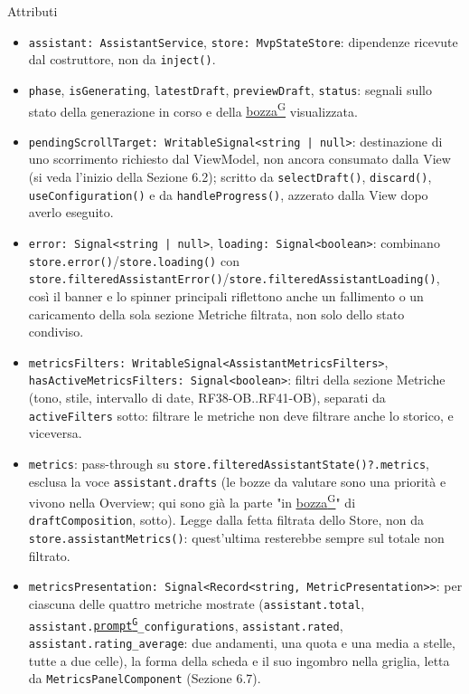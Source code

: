 \documentclass[a4paper,12pt]{article}
\providecommand{\glslink}[2]{\href{https://alittlebyte-19.github.io/Documentazione/glossario.html\#gls-#1}{\underline{#2}\textsuperscript{\scriptsize G}}}
\begin{document}
\begin{sloppypar}
Attributi
\begin{itemize}\raggedright
    \item \texttt{assistant: AssistantService}, \texttt{store: MvpStateStore}: dipendenze ricevute dal costruttore, non da \texttt{inject()}.
    \item \texttt{phase}, \texttt{isGenerating}, \texttt{latestDraft}, \texttt{previewDraft}, \texttt{status}: segnali sullo stato della generazione in corso e della \glslink{bozza-draft}{bozza} visualizzata.
    \item \texttt{pendingScrollTarget: WritableSignal<string | null>}: destinazione di uno scorrimento richiesto dal ViewModel, non ancora consumato dalla View (si veda l'inizio della Sezione 6.2); scritto da \texttt{selectDraft()}, \texttt{discard()}, \texttt{useConfiguration()} e da \texttt{handleProgress()}, azzerato dalla View dopo averlo eseguito.
    \item \texttt{error: Signal<string | null>}, \texttt{loading: Signal<boolean>}: combinano \texttt{store.error()}/\texttt{store.loading()} con \texttt{store.filteredAssistantError()}/\texttt{store.filteredAssistantLoading()}, così il banner e lo spinner principali riflettono anche un fallimento o un caricamento della sola sezione Metriche filtrata, non solo dello stato condiviso.
    \item \texttt{metricsFilters: WritableSignal<AssistantMetricsFilters>}, \texttt{hasActiveMetricsFilters: Signal<boolean>}: filtri della sezione Metriche (tono, stile, intervallo di date, RF38-OB..RF41-OB), separati da \texttt{activeFilters} sotto: filtrare le metriche non deve filtrare anche lo storico, e viceversa.
    \item \texttt{metrics}: pass-through su \texttt{store.filteredAssistantState()?.metrics}, esclusa la voce \texttt{assistant.drafts} (le bozze da valutare sono una priorità e vivono nella Overview; qui sono già la parte "in \glslink{bozza-draft}{bozza}" di \texttt{draftComposition}, sotto). Legge dalla fetta filtrata dello Store, non da \texttt{store.assistantMetrics()}: quest'ultima resterebbe sempre sul totale non filtrato.
    \item \texttt{metricsPresentation: Signal<Record<string, MetricPresentation>>}: per ciascuna delle quattro metriche mostrate (\texttt{assistant.total}, \texttt{assistant.\glslink{prompt}{prompt}\_configurations}, \texttt{assistant.rated}, \texttt{assistant.rating\_average}: due andamenti, una quota e una media a stelle, tutte a due celle), la forma della scheda e il suo ingombro nella griglia, letta da \texttt{MetricsPanelComponent} (Sezione 6.7).

\end{itemize}
\end{sloppypar}
\end{document}
